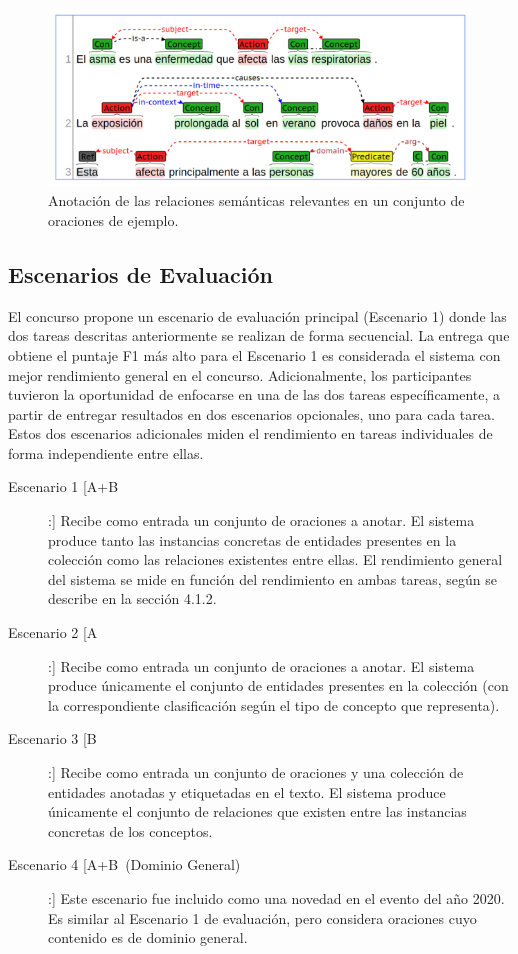 \begin{figure}[h!]
	\centering
	\includegraphics[width=0.9\linewidth]{Graphics/relations.png}
	\caption{Anotación de las relaciones semánticas relevantes en un conjunto de oraciones de ejemplo.} \label{fig:relations_ex}
\end{figure}


\subsection{Escenarios de Evaluación}

El concurso propone un escenario de evaluación principal (Escenario 1) donde las dos tareas descritas anteriormente se realizan de forma secuencial.
La entrega que obtiene el puntaje F1 más alto para el Escenario 1 es
considerada el sistema con mejor rendimiento general en el concurso.
Adicionalmente, los participantes tuvieron la oportunidad de enfocarse en una de las dos tareas específicamente, a partir de entregar resultados en dos escenarios opcionales, uno para cada tarea.
Estos dos escenarios adicionales miden el rendimiento en tareas individuales de forma independiente entre ellas.

\begin{description}
	
\item[Escenario 1 [A+B]:] Recibe como entrada un conjunto de oraciones a anotar.
El sistema produce tanto las instancias concretas de entidades
presentes en la colección como las relaciones existentes entre ellas.
El rendimiento general del sistema se mide en función
del rendimiento en ambas tareas, según se describe en la sección 4.1.2.
 
\item[Escenario 2 [A]:] Recibe como entrada un conjunto de oraciones a anotar.
El sistema produce únicamente el conjunto de entidades presentes en la colección (con la correspondiente clasificación según el tipo de concepto que representa).

\item[Escenario 3 [B]:] Recibe como entrada un conjunto de oraciones y una colección de entidades anotadas y etiquetadas en el texto.
El sistema produce únicamente el conjunto de relaciones que existen entre las instancias concretas de los conceptos.

\item[Escenario 4 [A+B~(Dominio General)]:] Este escenario fue incluido como una novedad en el evento del año 2020.
Es similar al Escenario 1 de evaluación, pero considera oraciones cuyo contenido es de dominio general.

\end{description} 

